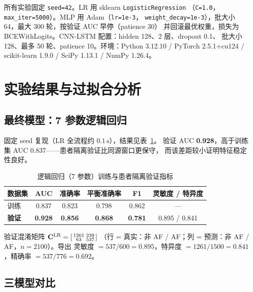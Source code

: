 \documentclass[11pt,a4paper]{ctexart}
\newcommand{\feat}[1]{\texttt{#1}}
\begin{document}
所有实验固定 \feat{seed=42}。LR 用 sklearn \feat{LogisticRegression}
（\feat{C=1.0}，\feat{max\_iter=5000}）。MLP 用 Adam（\feat{lr=1e-3}，
\feat{weight\_decay=1e-3}），批大小 64，最大 300 轮，按验证 AUC 早停（patience 30）
并回滚最优权重，损失为 BCEWithLogits。CNN-LSTM 配置：hidden 128、2 层、dropout 0.1、
批大小 128、最多 50 轮、patience 10。环境：Python 3.12.10 / PyTorch 2.5.1+cu124 /
scikit-learn 1.9.0 / SciPy 1.13.1 / NumPy 1.26.4。

\section{实验结果与过拟合分析}
\label{sec:results}

\subsection{最终模型：7 参数逻辑回归}
\label{sec:lr-results}

固定 seed 复现（LR 全流程约 $0.1\,\mathrm{s}$），结果见表~\ref{tab:lr}。
验证 AUC \textbf{0.928}，高于训练集 AUC 0.837——患者隔离验证比同源窗口更保守，
而该差距较小证明特征稳定性良好。

\begin{table}[htbp]
\centering
\caption{逻辑回归（7 参数）训练与患者隔离验证指标}
\label{tab:lr}
\begin{tabular}{lccccc}
\toprule
数据集 & AUC & 准确率 & 平衡准确率 & F1 & 灵敏度 / 特异度 \\
\midrule
训练 & 0.837 & 0.823 & 0.798 & 0.862 & --- \\
\textbf{验证} & \textbf{0.928} & \textbf{0.856} & \textbf{0.868} & \textbf{0.781} & 0.895 / 0.841 \\
\bottomrule
\end{tabular}
\end{table}

验证混淆矩阵 $\mathbf{C}^{\mathrm{LR}} =
\begin{bsmallmatrix} 1261 & 239 \\ 63 & 537 \end{bsmallmatrix}$
（行 = 真实：非 AF / AF；列 = 预测：非 AF / AF，$n=2100$）。导出
灵敏度 $=537/600=0.895$，特异度 $=1261/1500=0.841$，精确率 $=537/776=0.692$。

\subsection{三模型对比}
\label{sec:comparison}
\end{document}
